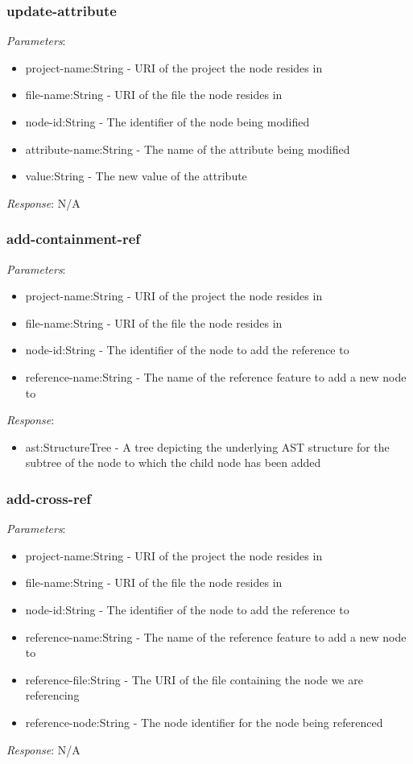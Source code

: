 \documentclass{report}
\begin{document}
\subsubsection{update-attribute}
\emph{Parameters}: 
\begin{itemize}
\item project-name:String - URI of the project the node resides in
\item file-name:String - URI of the file the node resides in
\item node-id:String - The identifier of the node being modified
\item attribute-name:String - The name of the attribute being modified
\item value:String - The new value of the attribute
\end{itemize}
\emph{Response}: N/A
\subsubsection{add-containment-ref}
\emph{Parameters}: 
\begin{itemize}
\item project-name:String - URI of the project the node resides in
\item file-name:String - URI of the file the node resides in
\item node-id:String - The identifier of the node to add the reference to
\item reference-name:String - The name of the reference feature to add a new node to
\end{itemize}
\emph{Response}: 
\begin{itemize}
\item ast:StructureTree - A tree depicting the underlying AST structure for the subtree of the node to which the child node has been added
\end{itemize}

\subsubsection{add-cross-ref}
\emph{Parameters}: 
\begin{itemize}
\item project-name:String - URI of the project the node resides in
\item file-name:String - URI of the file the node resides in
\item node-id:String - The identifier of the node to add the reference to
\item reference-name:String - The name of the reference feature to add a new node to
\item reference-file:String - The URI of the file containing the node we are referencing
\item reference-node:String - The node identifier for the node being referenced
\end{itemize}
\emph{Response}: N/A
\end{document}
